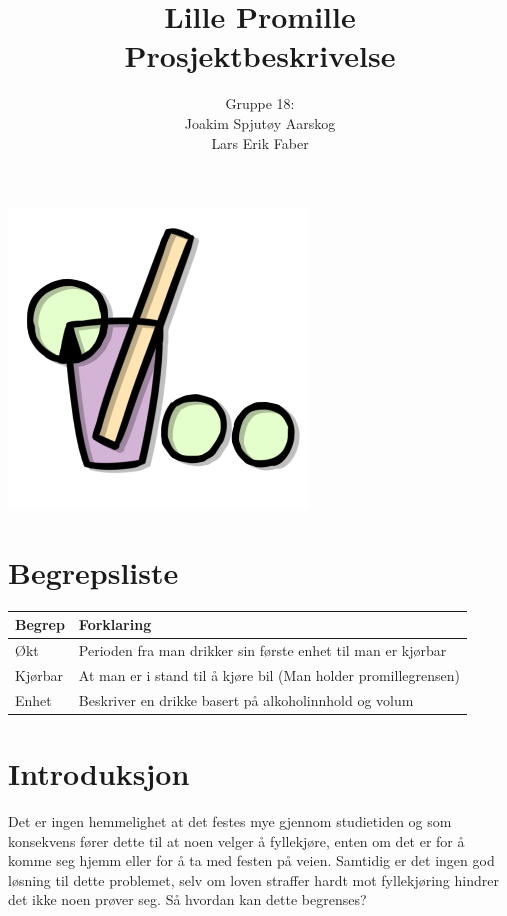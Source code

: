 \documentclass[12pt]{article}
\begin{document}
\title{%
    Lille Promille\\
    \large Prosjektbeskrivelse}
\author{
    Gruppe 18:\\
    Joakim Spjutøy Aarskog\\
    Lars Erik Faber}
\date{}
\maketitle
\begin{center}
    \includegraphics[scale=3]{images/lille_promille_logo.png}    
\end{center}
\thispagestyle{empty}
\newpage
\thispagestyle{empty}
\newpage
\setcounter{page}{1}

\section{Begrepsliste}
\begin{tabular}{ | m{4cm} | m{12cm} | } 
    \hline
    \textbf{Begrep} & \textbf{Forklaring} \\
    \hline
    Økt & Perioden fra man drikker sin første enhet til man er kjørbar \\
    \hline
    Kjørbar & At man er i stand til å kjøre bil (Man holder promillegrensen) \\
    \hline
    Enhet & Beskriver en drikke basert på alkoholinnhold og volum \\
    \hline
  \end{tabular}

\section{Introduksjon}
Det er ingen hemmelighet at det festes mye gjennom studietiden og som konsekvens fører dette til at noen velger å fyllekjøre, enten om det er for å komme seg hjemm eller for å ta med festen på veien. Samtidig er det ingen god løsning til dette problemet, selv om loven straffer hardt mot fyllekjøring hindrer det ikke noen prøver seg. Så hvordan kan dette begrenses?
\end{document}
